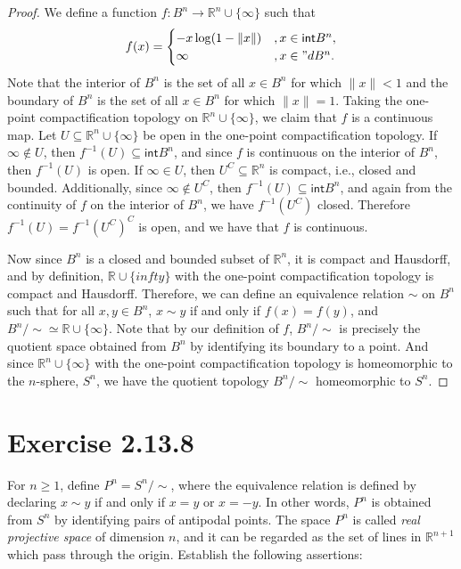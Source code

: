 \documentclass[12pt]{article}
\newenvironment{problem}
    {\begin{lrbox}{\mybox}\begin{minipage}{\textwidth-10pt}}
    {\end{minipage}\end{lrbox}\framebox[6.5in]{\usebox{\mybox}}}
\newcommand{\R}{\mathbb{R}}
\renewcommand{\int}{\mathsf{int}}
\begin{document}
\begin{proof}
    We define a function $f:B^n\to\R^n\cup\{\infty\}$ such that
    \[f(x) = 
        \begin{cases}
            -x\log(1-\|x\|) &, x\in\int B^n, \\
            \infty &, x\in"dB^n.
        \end{cases}
    \]
    Note that the interior of $B^n$ is the set of all $x\in B^n$ for which $\|x\|<1$ and the boundary of $B^n$ is the set of all $x\in B^n$ for which $\|x\|=1$. Taking the one-point compactification topology on $\R^n\cup\{\infty\}$, we claim that $f$ is a continuous map. Let $U\subseteq\R^n\cup\{\infty\}$ be open in the one-point compactification topology. If $\infty\notin U$, then $f^{-1}(U)\subseteq\int B^n$, and since $f$ is continuous on the interior of $B^n$, then $f^{-1}(U)$ is open. If $\infty\in U$, then $U^C\subseteq\R^n$ is compact, i.e., closed and bounded. Additionally, since $\infty\notin U^C$, then $f^{-1}(U)\subseteq\int B^n$, and again from the continuity of $f$ on the interior of $B^n$, we have $f^{-1}(U^C)$ closed. Therefore $f^{-1}(U)=f^{-1}(U^C)^C$ is open, and we have that $f$ is continuous. 
    
    Now since $B^n$ is a closed and bounded subset of $\R^n$, it is compact and Hausdorff, and by definition, $\R\cup\{infty\}$ with the one-point compactification topology is compact and Hausdorff. Therefore, we can define an equivalence relation $\sim$ on $B^n$ such that for all $x,y\in B^n$, $x\sim y$ if and only if $f(x)=f(y)$, and $B^n/\sim \simeq \R\cup\{\infty\}$. Note that by our definition of $f$, $B^n/\sim$ is precisely the quotient space obtained from $B^n$ by identifying its boundary to a point. And since $\R^n\cup\{\infty\}$ with the one-point compactification topology is homeomorphic to the $n$-sphere, $S^n$, we have the quotient topology $B^n/\sim$ homeomorphic to $S^n$.
    
\end{proof}

\section*{Exercise 2.13.8}
\begin{problem}
    For $n\geq 1$, define $P^n=S^n/\sim$, where the equivalence relation is defined by declaring $x\sim y$ if and only if $x=y$ or $x=-y$. In other words, $P^n$ is obtained from $S^n$ by identifying pairs of antipodal points. The space $P^n$ is called \emph{real projective space} of dimension $n$, and it can be regarded as the set of lines in $\R^{n+1}$ which pass through the origin. Establish the following assertions:
\end{problem}
\end{document}
